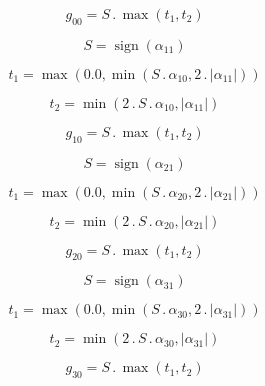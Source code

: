 \documentclass{article}
\begin{document}
\begin{dmath}g_{00} = S \,.\, \max\left(t_{1}, t_{2}\right)\end{dmath}

\begin{dmath}S = \operatorname{sign}{\left (\alpha_{11} \right )}\end{dmath}

\begin{dmath}t_{1} = \max\left(0.0, \min\left(S \,.\, \alpha_{10}, 2 \,.\, \left|{\alpha_{11}}\right|\right)\right)\end{dmath}

\begin{dmath}t_{2} = \min\left(2 \,.\, S \,.\, \alpha_{10}, \left|{\alpha_{11}}\right|\right)\end{dmath}

\begin{dmath}g_{10} = S \,.\, \max\left(t_{1}, t_{2}\right)\end{dmath}

\begin{dmath}S = \operatorname{sign}{\left (\alpha_{21} \right )}\end{dmath}

\begin{dmath}t_{1} = \max\left(0.0, \min\left(S \,.\, \alpha_{20}, 2 \,.\, \left|{\alpha_{21}}\right|\right)\right)\end{dmath}

\begin{dmath}t_{2} = \min\left(2 \,.\, S \,.\, \alpha_{20}, \left|{\alpha_{21}}\right|\right)\end{dmath}

\begin{dmath}g_{20} = S \,.\, \max\left(t_{1}, t_{2}\right)\end{dmath}

\begin{dmath}S = \operatorname{sign}{\left (\alpha_{31} \right )}\end{dmath}

\begin{dmath}t_{1} = \max\left(0.0, \min\left(S \,.\, \alpha_{30}, 2 \,.\, \left|{\alpha_{31}}\right|\right)\right)\end{dmath}

\begin{dmath}t_{2} = \min\left(2 \,.\, S \,.\, \alpha_{30}, \left|{\alpha_{31}}\right|\right)\end{dmath}

\begin{dmath}g_{30} = S \,.\, \max\left(t_{1}, t_{2}\right)\end{dmath}
\end{document}
